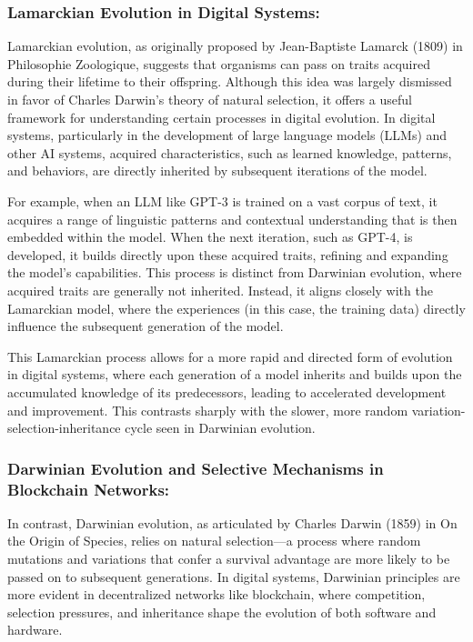 \documentclass[12pt,twoside]{article}
\begin{document}
\subsubsection{Lamarckian Evolution in Digital Systems:}

Lamarckian evolution, as originally proposed by Jean-Baptiste Lamarck (1809) in Philosophie Zoologique, suggests that organisms can pass on traits acquired during their lifetime to their offspring. Although this idea was largely dismissed in favor of Charles Darwin’s theory of natural selection, it offers a useful framework for understanding certain processes in digital evolution. In digital systems, particularly in the development of large language models (LLMs) and other AI systems, acquired characteristics, such as learned knowledge, patterns, and behaviors, are directly inherited by subsequent iterations of the model.

For example, when an LLM like GPT-3 is trained on a vast corpus of text, it acquires a range of linguistic patterns and contextual understanding that is then embedded within the model. When the next iteration, such as GPT-4, is developed, it builds directly upon these acquired traits, refining and expanding the model's capabilities. This process is distinct from Darwinian evolution, where acquired traits are generally not inherited. Instead, it aligns closely with the Lamarckian model, where the experiences (in this case, the training data) directly influence the subsequent generation of the model.

This Lamarckian process allows for a more rapid and directed form of evolution in digital systems, where each generation of a model inherits and builds upon the accumulated knowledge of its predecessors, leading to accelerated development and improvement. This contrasts sharply with the slower, more random variation-selection-inheritance cycle seen in Darwinian evolution.

\subsubsection{Darwinian Evolution and Selective Mechanisms in Blockchain Networks:}

In contrast, Darwinian evolution, as articulated by Charles Darwin (1859) in On the Origin of Species, relies on natural selection—a process where random mutations and variations that confer a survival advantage are more likely to be passed on to subsequent generations. In digital systems, Darwinian principles are more evident in decentralized networks like blockchain, where competition, selection pressures, and inheritance shape the evolution of both software and hardware.
\end{document}
